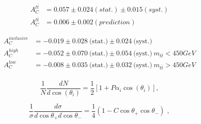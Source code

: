 \begin{equation}
	\begin{aligned}
	A^{t\bar{t}}_C &= 0.057 \pm 0.024 (stat.) \pm 0.015 (syst.) \\
	A^{t\bar{t}}_C &= 0.006 \pm 0.002 (prediction)
	\end{aligned}
\end{equation}



\begin{equation}
	\begin{aligned}
	A_{C}^{inclusive} &= -0.019 \pm 0.028~\text{(stat.)} \pm 0.024~\text{(syst.)} \\
	A_{C}^{high}       &= -0.052 \pm 0.070~\text{(stat.)} \pm 0.054~\text{(syst.)}~m_{t\bar{t}} < 450 GeV \\
	A_{C}^{low}         &= -0.008 \pm 0.035~\text{(stat.)} \pm 0.032~\text{(syst.)}~m_{t\bar{t}} > 450 GeV \\
	\end{aligned}
\end{equation}

\begin{equation}
\frac{1}{N} \frac{dN}{d \cos (\theta_i)} = \frac{1}{2} \left[1 + P \alpha_i \cos(\theta_i) \right],
\end{equation}
\label{equ:topdiffxsec}


\begin{equation}
\label{eq:coscos}
\frac{1}{\sigma} \frac{d\sigma}{d\cos\theta_+ d\cos\theta_-} =
\frac{1}{4} ( 1 - C \cos\theta_+ \cos\theta_- ) \,\, ,
\end{equation}


